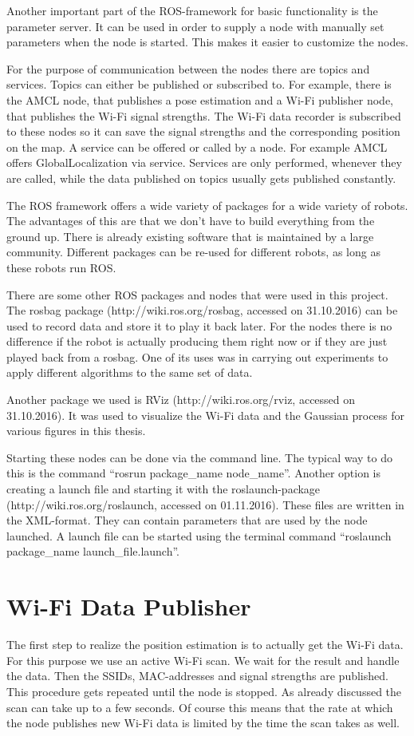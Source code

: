 Another important part of the ROS-framework for basic functionality is the parameter server. It can be used in order to supply a node with manually set parameters when the node is started. This makes it easier to customize the nodes. 

For the purpose of communication between the nodes there are topics and services. Topics can either be published or subscribed to. For example, there is the AMCL node, that publishes a pose estimation and a Wi-Fi publisher node, that publishes the Wi-Fi signal strengths. The Wi-Fi data recorder is subscribed to these nodes so it can save the signal strengths and the corresponding position on the map. A service can be offered or called by a node. For example AMCL offers \gls{GlobalLocalization} via service. Services are only performed, whenever they are called, while the data published on topics usually gets published constantly.

The ROS framework offers a wide variety of packages for a wide variety of robots. The advantages of this are that we don't have to build everything from the ground up. There is already existing software that is maintained by a large community. Different packages can be re-used for different robots, as long as these robots run ROS. 

There are some other ROS packages and nodes that were used in this project. The rosbag package (http://wiki.ros.org/rosbag, accessed on 31.10.2016) can be used to record data and store it to play it back later. For the nodes there is no difference if the robot is actually producing them right now or if they are just played back from a rosbag. One of its uses was in carrying out experiments to apply different algorithms to the same set of data. 

Another package we used is RViz (http://wiki.ros.org/rviz, accessed on 31.10.2016). It was used to visualize the Wi-Fi data and the Gaussian process for various figures in this thesis. 

Starting these nodes can be done via the command line. The typical way to do this is the command ``rosrun package\_name node\_name''. Another option is creating a launch file and starting it with the roslaunch-package (http://wiki.ros.org/roslaunch, accessed on 01.11.2016). These files are written in the XML-format. They can contain parameters that are used by the node launched. A launch file can be started using the terminal command ``roslaunch package\_name launch\_file.launch''.

\section{Wi-Fi Data Publisher}\label{sec:publisher}
The first step to realize the position estimation is to actually get the Wi-Fi data. For this purpose we use an active Wi-Fi scan. We wait for the result and handle the data. Then the \gls{SSID}s, \Gls{MAC-address}es and signal strengths are published. This procedure gets repeated until the node is stopped. As already discussed the scan can take up to a few seconds. Of course this means that the rate at which the node publishes new Wi-Fi data is limited by the time the scan takes as well.


